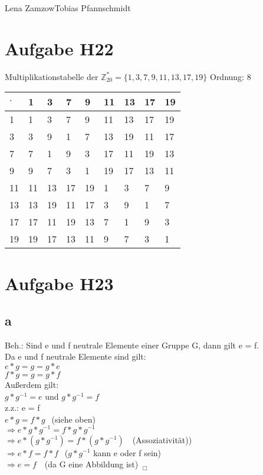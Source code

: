 \documentclass[11pt,a4paper]{article}
\begin{document}
                {Lena Zamzow}{Tobias Pfannschmidt}{}{}{}


\section*{Aufgabe H22}
Multiplikationstabelle der $\mathbb{Z}^{*}_{20} = \{1,3,7,9,11,13,17,19\}$ Ordnung: 8\\
\begin{center}
	\begin{tabular}{ | l | l | l | l | l | l | l| l|l}
		\hline
		$\cdot$&1&3&7&9&11&13&17&19 \\ \hline \hline		
		1&1&3&7&9&11&13&17&19 \\ \hline 	
		3&3&9&1&7&13&19&11&17 \\ \hline
		7&7&1&9&3&17&11&19&13\\ \hline	
		9&9&7&3&1&19&17&13&11 \\ \hline
		11&11&13&17&19&1&3&7&9 \\ \hline
		13&13&19&11&17&3&9&1&7 \\ \hline
		17&17&11&19&13&7&1&9&3 \\ \hline
		19&19&17&13&11&9&7&3&1 \\ \hline 
	\end{tabular}
\end{center}
\section*{Aufgabe H23}
\subsection*{a}
Beh.: Sind e und f neutrale Elemente einer Gruppe G, dann gilt e = f. \\

Da e und f neutrale Elemente sind gilt: \\
$e \ast g = g = g \ast e$ \\
$f \ast g = g = g \ast f$ \\
Außerdem gilt: \\
$g \ast g^{-1} = e$ und $g \ast g^{-1} = f$ \\

z.z.: e = f \\
$ e \ast g = f \ast g ~~$   (siehe oben) \\
$\Rightarrow e \ast g \ast g^{-1} = f \ast g \ast g^{-1}~~$ \\
$\Rightarrow e \ast (g \ast g^{-1}) = f \ast (g \ast g^{-1})~~~$   (Assoziativität))  \\
$\Rightarrow e \ast f = f \ast f ~~$ ($g \ast g^{-1}$ kann e oder f sein) \\
$\Rightarrow e = f ~~~$ (da G eine Abbildung ist) $~_\Box$
\end{document}
